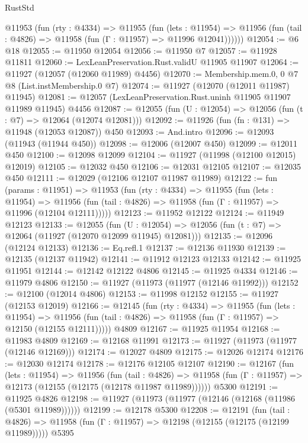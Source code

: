 \begin{lexlean}{RustStd}
\begin{coremodule}
      @11953
        (fun (rty : @4334) =>
        @11955
          (fun (lets : @11954) =>
          @11956 (fun (tail : @4826) => @11958 (fun (Γ : @11957) => @11996 @12041))))))
@12054 := @6 @18
@12055 := @11950 @12054
@12056 := @11950 @7
@12057 := @11928 @11811
@12060 := LexLeanPreservation.Rust.validU @11905 @11907
@12064 := @11927 (@12057 (@12060 @11989) @4456)
@12070 := Membership.mem.{0, 0} @7 @8 (List.instMembership.{0} @7)
@12074 := @11927 (@12070 (@12011 @11987) @11945)
@12081 := @12057 (LexLeanPreservation.Rust.uninh @11905 @11907 @11989 @11945) @4456
@12087 := @12055 (fun (U : @12054) => @12056 (fun (t : @7) => @12064 (@12074 @12081)))
@12092 := @11926 (fun (fn : @131) => @11948 (@12053 @12087)) @450
@12093 := And.intro
@12096 := @12093 (@11943 (@11944 @450))
@12098 := @12006 (@12007 @450)
@12099 := @12011 @450
@12100 := @12098 @12099
@12104 := @11927 (@11998 (@12100 @12015) @12019)
@12105 := @12032 @450
@12106 := @12031 @12105
@12107 := @12035 @450
@12111 := @12029 (@12106 @12107 @11987 @11989)
@12122 := fun (params : @11951) =>
  @11953
    (fun (rty : @4334) =>
    @11955
      (fun (lets : @11954) =>
      @11956 (fun (tail : @4826) => @11958 (fun (Γ : @11957) => @11996 (@12104 @12111)))))
@12123 := @11952 @12122
@12124 := @11949 @12123
@12133 := @12055
    (fun (U : @12054) => @12056 (fun (t : @7) => @12064 (@11927 (@12070 @12099 @11945) @12081)))
@12135 := @12096 (@12124 @12133)
@12136 := Eq.refl.{1}
@12137 := @12136 @11930
@12139 := @12135 (@12137 @11942)
@12141 := @11912 @12123 @12133
@12142 := @11925 @11951
@12144 := @12142 @12122 @4806
@12145 := @11925 @4334
@12146 := @11979 @4806
@12150 := @11927 (@11973 (@11977 (@12146 @11992)))
@12152 := @12100 (@12014 @4806)
@12153 := @11998 @12152
@12155 := @11927 (@12153 @12019)
@12166 := @12145
    (fun (rty : @4334) =>
    @11955
      (fun (lets : @11954) =>
      @11956 (fun (tail : @4826) => @11958 (fun (Γ : @11957) => @12150 (@12155 @12111)))))
    @4809
@12167 := @11925 @11954
@12168 := @11983 @4809
@12169 := @12168 @11991
@12173 := @11927 (@11973 (@11977 (@12146 @12169)))
@12174 := @12027 @4809
@12175 := @12026 @12174
@12176 := @12030 @12174
@12178 := @12176 @12105 @12107
@12190 := @12167
    (fun (lets : @11954) =>
    @11956
      (fun (tail : @4826) =>
      @11958 (fun (Γ : @11957) => @12173 (@12155 (@12175 (@12178 @11987 @11989))))))
    @5300
@12191 := @11925 @4826
@12198 := @11927 (@11973 (@11977 (@12146 (@12168 (@11986 (@5301 @11989))))))
@12199 := @12178 @5300
@12208 := @12191
    (fun (tail : @4826) => @11958 (fun (Γ : @11957) => @12198 (@12155 (@12175 (@12199 @11989)))))
    @5395

\end{coremodule}
\end{lexlean}
